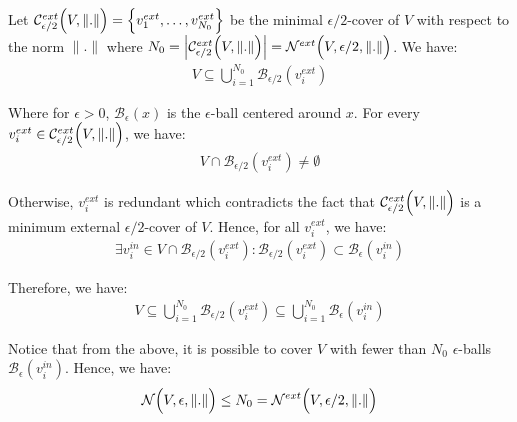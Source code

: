 \begin{proof*}
    Let $\mathcal{C}_{\epsilon/2}^{ext}\Big( V, \|.\| \Big)=\Big\{ v_1^{ext}, \dots, v_{N_0}^{ext} \Big\}$ be the minimal $\epsilon/2$-cover of $V$ with respect to the norm $\|.\|$ where $N_0 = \Big| \mathcal{C}_{\epsilon/2}^{ext}\Big( V, \|.\| \Big) \Big| = \mathcal{N}^{ext}\Big( V, \epsilon/2, \|.\| \Big)$. We have:
    \begin{align*}
        V \subseteq \bigcup_{i=1}^{N_0} \mathcal{B}_{\epsilon/2}(v_i^{ext})
    \end{align*}

    \noindent Where for $\epsilon>0$, $\mathcal{B}_{\epsilon}(x)$ is the $\epsilon$-ball centered around $x$. For every $v_i^{ext}\in \mathcal{C}_{\epsilon/2}^{ext}\Big( V, \|.\| \Big)$, we have:
    \begin{align*}
        V \cap \mathcal{B}_{\epsilon/2}(v_i^{ext}) \ne \emptyset
    \end{align*}

    \noindent Otherwise, $v_i^{ext}$ is redundant which contradicts the fact that $\mathcal{C}_{\epsilon/2}^{ext}\Big( V, \|.\| \Big)$ is a minimum external $\epsilon/2$-cover of $V$. Hence, for all $v_i^{ext}$, we have:
    \begin{align*}
        \exists v_i^{in} \in V \cap \mathcal{B}_{\epsilon/2}(v_i^{ext}) : \mathcal{B}_{\epsilon/2}(v_i^{ext}) \subset \mathcal{B}_{\epsilon}(v_i^{in})
    \end{align*}

    \noindent Therefore, we have:
    \begin{align*}
        V \subseteq \bigcup_{i=1}^{N_0} \mathcal{B}_{\epsilon/2}(v_i^{ext}) \subseteq \bigcup_{i=1}^{N_0}\mathcal{B}_\epsilon(v_i^{in})
    \end{align*}

    \noindent Notice that from the above, it is possible to cover $V$ with fewer than $N_0$ $\epsilon$-balls $\mathcal{B}_\epsilon(v_i^{in})$. Hence, we have:
    \begin{align*}
        \mathcal{N}\Big( V, \epsilon, \|.\| \Big) \le N_0 = \mathcal{N}^{ext}\Big( V, \epsilon/2, \|.\| \Big)
    \end{align*}
\end{proof*}

